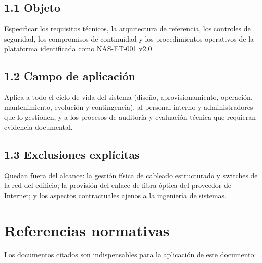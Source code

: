\documentclass[10pt,a4paper]{article}
\begin{document}
\subsection{1.1 Objeto}
Especificar los requisitos técnicos, la arquitectura de referencia, los controles de seguridad, los compromisos de continuidad y los procedimientos operativos de la plataforma identificada como NAS-ET-001 v2.0.

\subsection{1.2 Campo de aplicación}
Aplica a todo el ciclo de vida del sistema (diseño, aprovisionamiento, operación, mantenimiento, evolución y contingencia), al personal interno y administradores que lo gestionen, y a los procesos de auditoría y evaluación técnica que requieran evidencia documental.

\subsection{1.3 Exclusiones explícitas}
Quedan fuera del alcance: la gestión física de cableado estructurado y switches de la red del edificio; la provisión del enlace de fibra óptica del proveedor de Internet; y los aspectos contractuales ajenos a la ingeniería de sistemas.

\section{Referencias normativas}
Los documentos citados son indispensables para la aplicación de este documento:
\end{document}
